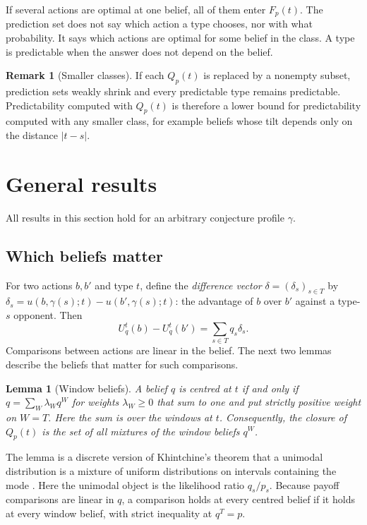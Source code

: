 \documentclass[12pt]{article}
\newtheorem{lemma}{Lemma}
\theoremstyle{definition}
\newtheorem{remark}{Remark}
\begin{document}
If several actions are optimal at one belief, all of them enter $F_p(t)$. The prediction set does not say which action a type chooses, nor with what probability. It says which actions are optimal for some belief in the class. A type is predictable when the answer does not depend on the belief.

\begin{remark}[Smaller classes]\label{rem:mono}
If each $Q_p(t)$ is replaced by a nonempty subset, prediction sets weakly shrink and every predictable type remains predictable. Predictability computed with $Q_p(t)$ is therefore a lower bound for predictability computed with any smaller class, for example beliefs whose tilt depends only on the distance $|t - s|$.
\end{remark}

\section{General results}\label{sec:results}

All results in this section hold for an arbitrary conjecture profile $\gamma$.

\subsection{Which beliefs matter}

For two actions $b, b'$ and type $t$, define the \emph{difference vector} $\delta = (\delta_s)_{s \in T}$ by $\delta_s = u(b, \gamma(s); t) - u(b', \gamma(s); t)$: the advantage of $b$ over $b'$ against a type-$s$ opponent. Then
\[
U^t_q(b) - U^t_q(b') = \sum_{s \in T} q_s \delta_s .
\]
Comparisons between actions are linear in the belief. The next two lemmas describe the beliefs that matter for such comparisons.

\begin{lemma}[Window beliefs]\label{lem:windows}
A belief $q$ is centred at $t$ if and only if $q = \sum_{W} \lambda_W q^W$ for weights $\lambda_W \ge 0$ that sum to one and put strictly positive weight on $W = T$. Here the sum is over the windows at $t$. Consequently, the closure of $Q_p(t)$ is the set of all mixtures of the window beliefs $q^W$.
\end{lemma}

The lemma is a discrete version of Khintchine's theorem that a unimodal distribution is a mixture of uniform distributions on intervals containing the mode \citep{khintchine1938}. Here the unimodal object is the likelihood ratio $q_s/p_s$. Because payoff comparisons are linear in $q$, a comparison holds at every centred belief if it holds at every window belief, with strict inequality at $q^T = p$.
\end{document}
